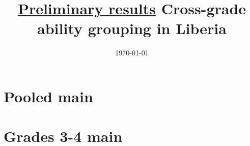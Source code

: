 \documentclass[11pt]{article}
\title{\underline{Preliminary results} \linebreak
	Cross-grade ability grouping in Liberia}
\date{\today}
\begin{document}
	\maketitle

\centering


%	

%	

\section*{Pooled main}

\begin{table}[H]
	\caption{Pooled with academy cohort fixed effects}
	
\end{table}

\begin{table}[H]
	\caption{Pooled with academy cohort and county fixed effects}
	
\end{table}

\begin{table}[H]
	\caption{Pooled with academy fixed effects}
	
\end{table}

\section*{Grades 3-4 main}

\begin{table}[H]
	\caption{Grades 3-4 with academy cohort fixed effects}
	
\end{table}

\begin{table}[H]
	\caption{Grades 3-4 with academy cohort and county fixed effects}
	
\end{table}
\end{document}
